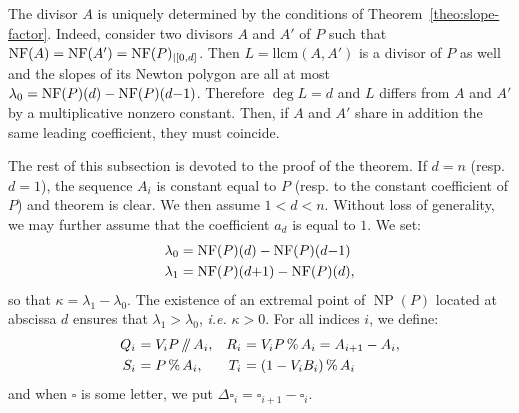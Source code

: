 \documentclass{sig-alternate-2013}
\DeclareMathOperator{\NP}{NP}
\newcommand{\NF}{\text{\rm NF}}
\renewcommand{\mod}{\,\%\,}
\renewcommand{\div}{\,/\hspace{-0.3em}/\,}
\begin{document}

%

\begin{rem}
\label{rem:unicity}
The divisor $A$ is uniquely determined by the conditions of 
Theorem~\ref{theo:slope-factor}. Indeed, consider two divisors
$A$ and $A'$ of $P$ such that $\NF(A) = \NF(A') = \NF(P)_{|[0,d]}$.
Then $L = \text{llcm}(A,A')$ is a divisor of $P$ as well and the 
slopes of its Newton polygon are all at most $\lambda_0 = \NF(P)(d) - 
\NF(P)(d{-}1)$. Therefore $\deg L = d$ and $L$ differs from $A$ and
$A'$ by a multiplicative nonzero constant. Then, if $A$ and $A'$ 
share in addition the same leading coefficient, they must coincide.
\end{rem}

The rest of this subsection is devoted to the proof of the theorem.
If $d = n$ (resp. $d = 1$), the sequence $A_i$ is constant equal to
$P$ (resp. to the constant coefficient of $P$) and theorem is clear.
We then assume $1 < d < n$. Without loss of generality, we may further 
assume that the coefficient $a_d$ is equal to $1$. We set:
\begin{align*}
\lambda_0 & = \NF(P)(d) - \NF(P)(d{-}1) \\
\lambda_1 & = \NF(P)(d{+}1) - \NF(P)(d),
\end{align*}
so that $\kappa = \lambda_1 - \lambda_0$.
The existence of an extremal point of $\NP(P)$ located at abscissa
$d$ ensures that $\lambda_1 > \lambda_0$, \emph{i.e.} $\kappa > 0$.
For all indices $i$, we define:
$$\begin{array}{r@{\,\,}lr@{\,\,}l}
Q_i &= V_i P \div A_i, &
R_i & = V_i P \mod A_i = A_{i+1} - A_i, 
\smallskip \\
S_i &= P \mod A_i, &
T_i &= (1 - V_i B_i) \mod A_i
\end{array}$$
and when $\square$ is some letter, we put $\Delta \square_i = \square_{i+1} 
- \square_i$.
\end{document}
